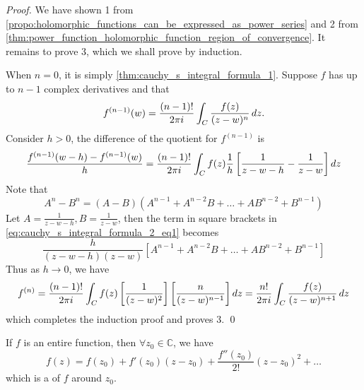 \documentclass[notoc,notitlepage]{tufte-book}
\begin{document}
\begin{proof}
	We have shown 1 from \cref{propo:holomorphic_functions_can_be_expressed_as_power_series} and 2 from \cref{thm:power_function_holomorphic_function_region_of_convergence}. It remains to prove 3, which we shall prove by induction.

	When $n = 0$, it is simply \cref{thm:cauchy_s_integral_formula_1}. Suppose $f$ has up to $n - 1$ complex derivatives and that
	\begin{equation*}
		f^{(n - 1)} (w) = \frac{(n - 1)!}{2 \pi i} \int_{C} \frac{f(z)}{(z - w)^n} \mathop{}\!d{z} .
	\end{equation*}
	Consider $h > 0$, the difference of the quotient for $f^{(n - 1)}$ is
	\begin{equation}\label{eq:cauchy_s_integral_formula_2_eq1}
		\frac{f^{(n-1)} (w - h) - f^{(n - 1)}(w)}{h} = \frac{(n-1)!}{2 \pi i} \int_{C} f(z) \frac{1}{h} \left[ \frac{1}{z - w - h} - \frac{1}{z - w} \right] \mathop{}\!d{z} 
	\end{equation}
	Note that
	\begin{equation*}
		A^n - B^n = (A - B)(A^{n-1} + A^{n - 2}B + \hdots + AB^{n - 2} + B^{n - 1})
	\end{equation*}
	Let $A = \frac{1}{z - w -h}, B = \frac{1}{z - w}$, then the term in square brackets in \cref{eq:cauchy_s_integral_formula_2_eq1} becomes
	\begin{equation*}
		\frac{h}{(z - w - h)(z - w)} \left[A^{n - 1} + A^{n - 2}B + \hdots + AB^{n - 2} + B^{n - 1}\right]
	\end{equation*}
	Thus as $h \to 0$, we have
	\begin{equation*}
		f^{(n)} = \frac{(n - 1)!}{2 \pi i} \int_{C} f(z) \left[\frac{1}{(z - w)^2} \right] \left[ \frac{n}{(z - w)^{n - 1}} \right] \mathop{}\!d{z} = \frac{n!}{2 \pi i} \int_{C} \frac{f(z)}{(z - w)^{n + 1}} \mathop{}\!d{z}
	\end{equation*}
	which completes the induction proof and proves 3. \qed
\end{proof}

\begin{crly}\label{crly:taylor_expansion_of_entire_functions}
	If $f$ is an entire function, then $\forall z_0 \in \mathbb{C}$, we have
	\begin{equation*}
		f(z) = f(z_0) + f'(z_0)(z - z_0) + \frac{f''(z_0)}{2!} (z - z_0)^2 + \hdots
	\end{equation*}
	which is a  of $f$ around $z_0$.
\end{crly}
\end{document}
